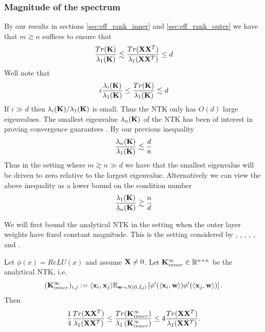 \subsubsection{Magnitude of the spectrum}
By our results in sections \ref{sec:eff_rank_inner} and \ref{sec:eff_rank_outer} we have that $m \gtrsim n$ suffices to ensure that
\[ \frac{Tr(\mathbf{K})}{\lambda_1(\mathbf{K})} \lesssim \frac{Tr(\mathbf{X} \mathbf{X}^T)}{\lambda_1(\mathbf{X} \mathbf{X}^T)} \leq d\]
Well note that
\begin{gather*}
i \frac{\lambda_i(\mathbf{K})}{\lambda_1(\mathbf{K})} \leq \frac{Tr(\mathbf{K})}{\lambda_1(\mathbf{K})} \lesssim d
\end{gather*}
If $i \gg d$ then $\lambda_i(\mathbf{K}) / \lambda_1(\mathbf{K})$ is small.  Thus the NTK only has $O(d)$ large eigenvalues.  The smallest eigenvalue $\lambda_n(\mathbf{K})$ of the NTK has been of interest in proving convergence guarantees \citep{du2019gradient,du2018gradient,solt_mod_over}.  
By our previous inequality 
\[ 
\frac{\lambda_n(\mathbf{K})}{\lambda_1(\mathbf{K})} \lesssim \frac{d}{n} 
\]
Thus in the setting where $m \gtrsim n \gg d$ we have that the smallest eigenvalue will be driven to zero relative to the largest eigenvalue.  
Alternatively we can view the above inequality as a lower bound on the condition number
\[ 
\frac{\lambda_1(\mathbf{K})}{\lambda_n(\mathbf{K})} \gtrsim \frac{n}{d} 
\]
\par
We will first bound the analytical NTK in the setting when the outer layer weights have fixed constant magnitude.  This is the setting considered by \cite{pmlr-v54-xie17a}, \cite{fine_grain_arora}, \citet{du2018gradient},   \cite{DBLP:journals/corr/abs-1906-05392}, \cite{pmlr-v108-li20j}, and \cite{solt_mod_over}.
\begin{theorem}
Let $\phi(x) = ReLU(x)$ and assume $\mathbf{X} \neq 0$.  Let $\mathbf{K}_{inner}^\infty \in \mathbb{R}^{n \times n}$ be the analytical NTK, i.e.
\[ (\mathbf{K}_{inner}^\infty)_{i, j} := \langle \mathbf{x}_i, \mathbf{x}_j \rangle \mathbb{E}_{\mathbf{w} \sim N(0, I_d)} \left[\phi'(\langle \mathbf{x}_i, \mathbf{w} \rangle) \phi'(\langle \mathbf{x}_j, \mathbf{w} \rangle)\right]. \]
Then
\[ \frac{1}{4} \frac{Tr(\mathbf{X} \mathbf{X}^T)}{\lambda_1(\mathbf{X} \mathbf{X}^T)} \leq \frac{Tr(\mathbf{K}_{inner}^\infty)}{\lambda_1 \left(\mathbf{K}_{inner}^\infty\right)} \leq 4\frac{Tr(\mathbf{X} \mathbf{X}^T)}{\lambda_1(\mathbf{X} \mathbf{X}^T)}.  
\]
\end{theorem}
